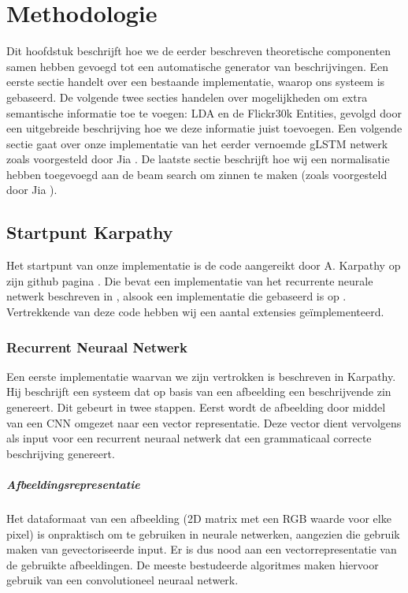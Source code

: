 \chapter{Methodologie}
Dit hoofdstuk beschrijft hoe we de eerder beschreven theoretische componenten samen hebben gevoegd tot een automatische generator van beschrijvingen. Een eerste sectie handelt over een bestaande implementatie, waarop ons systeem is gebaseerd. De volgende twee secties handelen over mogelijkheden om extra semantische informatie toe te voegen: LDA en de Flickr30k Entities, gevolgd door een uitgebreide beschrijving hoe we deze informatie juist toevoegen. Een volgende sectie gaat over onze implementatie van het eerder vernoemde gLSTM netwerk zoals voorgesteld door Jia . De laatste sectie beschrijft hoe wij een normalisatie hebben toegevoegd aan de beam search om zinnen te maken (zoals voorgesteld door Jia ).

\section{Startpunt Karpathy} 
Het startpunt van onze implementatie is de code aangereikt door A. Karpathy op zijn github pagina . Die bevat een implementatie van het recurrente neurale netwerk beschreven in , alsook een implementatie die gebaseerd is op . Vertrekkende van deze code hebben wij een aantal extensies ge\"implementeerd.
\subsection{Recurrent Neuraal Netwerk}
Een eerste implementatie waarvan we zijn vertrokken is beschreven in Karpathy. Hij beschrijft een systeem dat op basis van een afbeelding een beschrijvende zin genereert. Dit gebeurt in twee stappen. Eerst wordt de afbeelding door middel van een CNN omgezet naar een vector representatie. Deze vector dient vervolgens als input voor een recurrent neuraal netwerk dat een grammaticaal correcte beschrijving genereert.

\paragraph{Afbeeldingsrepresentatie}
Het dataformaat van een afbeelding (2D matrix met een RGB waarde voor elke pixel) is onpraktisch om te gebruiken in neurale netwerken, aangezien die gebruik maken van gevectoriseerde input. Er is dus nood aan een vectorrepresentatie van de gebruikte afbeeldingen. De meeste bestudeerde algoritmes maken hiervoor gebruik van een convolutioneel neuraal netwerk.

